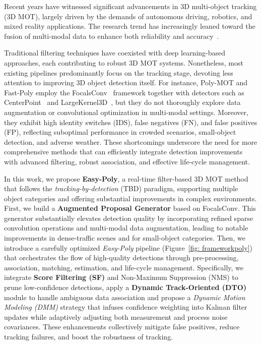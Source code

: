 
Recent years have witnessed significant advancements in 3D multi-object tracking (3D MOT), largely driven by the demands of autonomous driving, robotics, and mixed reality applications. The research trend has increasingly leaned toward the fusion of multi-modal data to enhance both reliability and accuracy~\cite{pftrack,ding20233dmotformer}. 

Traditional filtering techniques have coexisted with deep learning-based approaches, each contributing to robust 3D MOT systems. Nonetheless, most existing pipelines predominantly focus on the tracking stage, devoting less attention to improving 3D object detection itself. For instance, Poly-MOT and Fast-Poly employ the FocalsConv~\cite{chen2022focal} framework together with detectors such as CenterPoint~\cite{yin2021center} and LargeKernel3D~\cite{chen2022scaling}, but they do not thoroughly explore data augmentation or convolutional optimization in multi-modal settings. Moreover, they exhibit high identity switches (IDS), false negatives (FN), and false positives (FP), reflecting suboptimal performance in crowded scenarios, small-object detection, and adverse weather. These shortcomings underscore the need for more comprehensive methods that can efficiently integrate detection improvements with advanced filtering, robust association, and effective life-cycle management.

In this work, we propose \textbf{Easy-Poly}, a real-time filter-based 3D MOT method that follows the \emph{tracking-by-detection} (TBD) paradigm, supporting multiple object categories and offering substantial improvements in complex environments. 
First, we build a \textbf{Augmented Proposal Generator} based on FocalsConv. This generator substantially elevates detection quality by incorporating refined sparse convolution operations and multi-modal data augmentation, leading to notable improvements in dense-traffic scenes and for small-object categories. Then, we introduce a carefully optimized \emph{Easy-Poly} pipeline (Figure~\ref{fig: frameworkpoly}) that orchestrates the flow of high-quality detections through pre-processing, association, matching, estimation, and life-cycle management. Specifically, we integrate \textbf{Score Filtering (SF)} and Non-Maximum Suppression (NMS) to prune low-confidence detections, apply a \textbf{Dynamic Track-Oriented (DTO)} module to handle ambiguous data association and propose a \emph{Dynamic Motion Modeling (DMM)} strategy that infuses confidence weighting into Kalman filter updates while adaptively adjusting both measurement and process noise covariances. These enhancements collectively mitigate false positives, reduce tracking failures, and boost the robustness of tracking.

